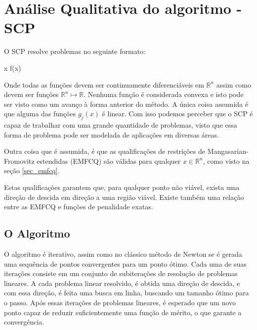 \section{Análise Qualitativa do algoritmo - SCP}

\noindent
O SCP resolve problemas no seguinte formato:

\vspace{-15pt}
\begin{mini!}
{x}{ f(x) \label{scp_obj}}{\label{prob_scp}}{}
\end{mini!}

Onde todas as funções devem ser continuamente diferenciáveis em \(\mathbb{R}^n\) assim como
devem ser funções \( \mathbb{R}^n \mapsto \mathbb{R} \). Nenhuma função é considerada convexa e isto
pode ser visto como um avanço à forma anterior do método. A única coisa assumida é que alguma das
funções \( g_j(x) \) é linear. Com isso podemos perceber que o SCP é capaz de trabalhar com uma
grande quantidade de problemas, visto que essa forma de problema pode ser modelada de aplicações
em diversas áreas.

Outra coisa que é assumida, é que as qualificações de restrições de Mangasarian-Fromovitz estendidas (EMFCQ)
\cite{di1994exact} são válidas para qualquer \( x \in \mathbb{R}^n \), como visto na seção \ref{sec_emfcq}.

Estas qualificações garantem que, para qualquer ponto não viável, exista uma
direção de descida em direção a uma região viável. Existe também uma relação entre as EMFCQ
e funções de penalidade exatas.


\subsection{O Algoritmo}

\noindent
O algoritmo é iterativo, assim como no clássico método de Newton se é gerada
uma sequência de pontos convergentes para um ponto ótimo.
Cada uma de suas iterações consiste em um conjunto de subiterações de
resolução de problemas lineares. A cada problema linear resolvido, é obtida
uma direção de descida, e com essa direção, é feita uma busca em linha,
buscando um tamanho ótimo para o passo. Após essas iterações de problemas
lineares, é esperado que um novo ponto capaz de reduzir suficientemente uma
função de mérito, o que garante a convergência.



